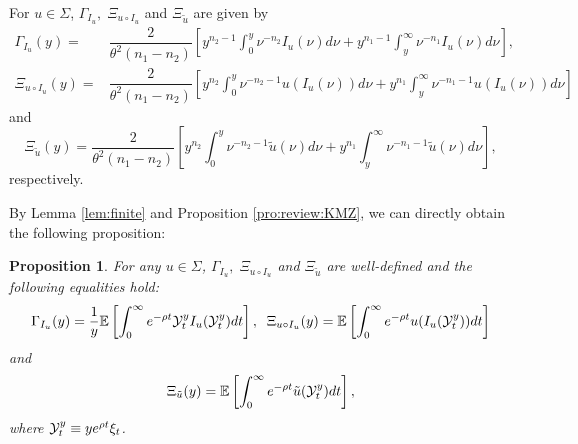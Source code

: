 \documentclass[a4paper,report, 11pt]{article}
\newtheorem{pro}{Proposition}[section]
\def\t{\theta}
\begin{document}
For $u\in \Sigma$, $\Gamma_{I_u},\;\Xi_{u\circ I_u}$ and $\Xi_{\tilde{u}}$ are given by
\begin{align*}
\Gamma_{I_u}(y)=&\dfrac{2}{\t^2(n_1-n_2)}\left[y^{n_2-1}\int_0^y \nu^{-n_2}I_u(\nu)d\nu +y^{n_1-1}\int_y^\infty \nu^{-n_1}I_u(\nu)d\nu\right],\\
\Xi_{u\circ I_u}(y)=&\dfrac{2}{\t^2(n_1-n_2)}\left[y^{n_2}\int_0^y \nu^{-n_2-1}u(I_u(\nu))d\nu +y^{n_1}\int_y^\infty \nu^{-n_1-1}u(I_u(\nu))d\nu\right]
\end{align*}
and 
\begin{equation*}
\Xi_{\tilde{u}} (y)=\dfrac{2}{\t^2(n_1-n_2)}\left[y^{n_2}\int_0^y \nu^{-n_2-1}\tilde{u}(\nu)d\nu +y^{n_1}\int_y^\infty \nu^{-n_1-1}\tilde{u}(\nu)d\nu\right],
\end{equation*}
respectively. 

By Lemma \ref{lem:finite} and Proposition \ref{pro:review:KMZ}, we can directly obtain the following proposition:
\begin{pro} For any $u\in \Sigma$, $\Gamma_{I_u},\;\Xi_{u\circ I_u}$ and $\Xi_{\tilde{u}}$ are well-defined and the following equalities hold:
	\begin{equation*}
	\Gamma_{I_u}(y)=\dfrac{1}{y}\mathbb{E}\left[\int_0^\infty e^{-\rho t}{\cal Y}_t^y I_u({\cal Y}_t^y)dt\right],\;\;	\Xi_{u\circ I_u}(y)=\mathbb{E}\left[\int_0^\infty e^{-\rho t}u(I_u({\cal Y}_t^y))dt\right]
	\end{equation*}
	and
	\begin{equation*}
	\Xi_{\tilde{u}}(y)=\mathbb{E}\left[\int_0^\infty e^{-\rho t}\tilde{u}({\cal Y}_t^y)dt\right],
	\end{equation*}
	where ${\cal Y}_t^y \equiv y e^{\rho t}\xi_t$. 
\end{pro}
\end{document}
